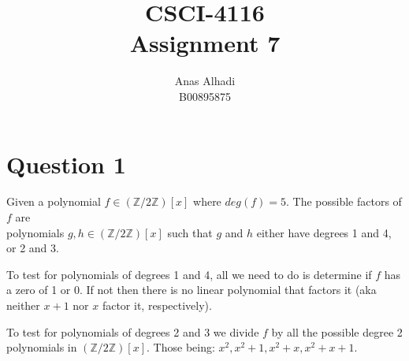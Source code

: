\documentclass{article}
\title{\textbf{CSCI-4116\\Assignment 7}}
\author{Anas Alhadi\\B00895875}
\numberwithin{equation}{subsection}
\begin{document}
	\maketitle

	\vspace{20pt}
	
	\hrulefill

	\vspace{25pt}
	\section*{Question 1}
	Given a polynomial $f \in (\mathbb{Z}/2\mathbb{Z})[x]$ where $deg(f) =5$. The
	possible factors of $f$ are \\polynomials $g, h \in (\mathbb{Z}/2\mathbb{Z})[x]$ such that
	$g$ and $h$ either have degrees 1 and 4, or 2 and 3.
	
	To test for polynomials of degrees 1 and 4, all we need to do is determine if $f$ has a zero of  1 or 0. If
	not then there is no linear polynomial that factors it (aka neither $x+1$ nor $x$ factor it, respectively).

	To test for polynomials of degrees 2 and 3 we divide $f$ by all the possible degree 2 polynomials in 
	$(\mathbb{Z}/2\mathbb{Z})[x]$. Those being: $x^2, x^2+1, x^2+x, x^2+x+1$.
\end{document}
